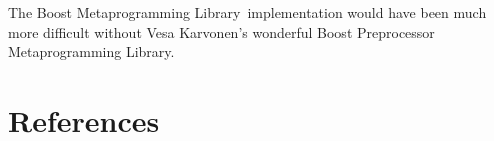 \documentclass{kapproc}
\newcommand{\Mpl}{Boost Meta\-pro\-gram\-ming Library}
\begin{document}
The \Mpl\ implementation would have been much more difficult without
Vesa Karvonen's wonderful Boost Preprocessor Metaprogramming Library.

\section{References}

{%

}











\end{document}
